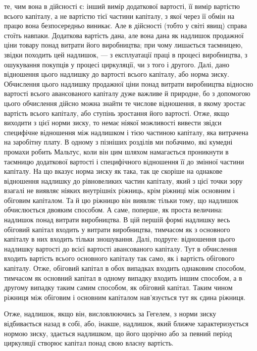 \parcont{}  %
те, чим вона в дійсності є: інший вимір додаткової вартості,
її вимір вартістю всього капіталу, а не вартістю тієї частини
капіталу, з якої через її обмін на працю вона безпосередньо
виникає. Але в дійсності (тобто у світі явищ) справа стоїть навпаки.
Додаткова вартість дана, але вона дана як надлишок продажної
ціни товару понад витрати його виробництва; при чому
лишається таємницею, звідки походить цей надлишок, — з експлуатації
праці в процесі виробництва, з ошукування покупців
у процесі циркуляції, чи з того і другого. Далі, дано відношення
цього надлишку до вартості всього капіталу, або
норма зиску. Обчислення цього надлишку продажної ціни понад
витрати виробництва відносно вартості всього авансованого капіталу
дуже важливе й природне, бо з допомогою цього обчислення
дійсно можна знайти те числове відношення, в якому
зростає вартість всього капіталу, або ступінь зростання його
вартості. Отже, якщо виходити з цієї норми зиску, то немає
ніякої можливості вивести звідси специфічне відношення між
надлишком і тією частиною капіталу, яка витрачена на заробітну
плату. В одному з пізніших розділів ми побачимо, які кумедні
промахи робить Мальтус, коли він цим шляхом намагається
проникнути в таємницю додаткової вартості і специфічного відношення
її до змінної частини капіталу. На що вказує норма
зиску як така, так це скоріше на однакове відношення надлишку
до рівновеликих частин капіталу, який з цієї точки зору взагалі
не виявляє ніяких внутрішніх ріжниць, крім ріжниці між основним
і обіговим капіталом. Та й цю ріжницю він виявляє тільки
тому, що надлишок обчислюється двояким способом. А саме,
поперше, як проста величина: надлишок понад витрати виробництва.
В цій першій формі надлишку весь обіговий капітал входить
у витрати виробництва, тимчасом як з основного капіталу
в них входить тільки зношування. Далі, подруге: відношення
цього надлишку вартості до всієї вартості авансованого капіталу.
Тут в обчислення входить вартість всього основного капіталу
так само, як і вартість обігового капіталу. Отже, обіговий
капітал в обох випадках входить однаковим способом, тимчасом
як основний капітал в одному випадку входить іншим
способом, а в другому випадку таким самим способом, як обіговий
капітал. Таким чином ріжниця між обіговим і основним капіталом
нав’язується тут як єдина ріжниця.

Отже, надлишок, якщо він, висловлюючись за Гегелем, з норми
зиску відбивається назад в собі, або, інакше, надлишок, який
ближче характеризується нормою зиску, здається надлишком,
що його щорічно або за певний період циркуляції створює капітал
понад свою власну вартість.

